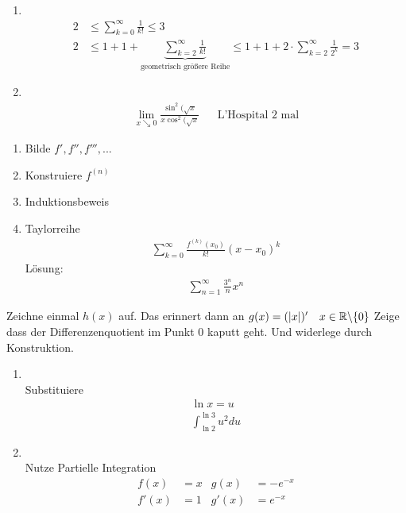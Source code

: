\begin{enumerate}[label=Aufgabe \arabic*:, , leftmargin=*]
\begin{enumerate}[label=\alph*)]
\begin{align*}
        \end{align*}
    \end{enumerate}
    \begin{enumerate}[label=\alph*)]
        \item \textbf{}\\%
        \begin{align*}
            2 &\leq \sum_{k = 0}^\infty \frac{1}{k!} \leq 3\\
            2 &\leq 1 + 1 + \underbrace{\sum_{k = 2}^\infty \frac{1}{k!}}_{\text{geometrisch größere Reihe}} \leq 1 + 1 + 2 \cdot \sum_{k = 2}^\infty \frac{1}{2^k} = 3
        \end{align*}
        \item \textbf{}\\%
        \begin{align*}
            \lim_{x \searrow 0} \frac{\sin^2(\sqrt{x}}{x \cos^2(\sqrt{x}} && \text{L'Hospital 2 mal}
        \end{align*}
    \end{enumerate}
    \begin{enumerate}[label=\underline{\arabic*}]
        \item Bilde $f', f'', f''', ...$
        \item Konstruiere $f^{(n)}$
        \item Induktionsbeweis
        \item Taylorreihe 
        \begin{align*}
            \sum_{k = 0}^\infty \frac{f^{(k)} (x_0)}{k!} (x - x_0) ^k
        \end{align*}
        Lösung:
        \begin{align*}
            \sum_{n=1}^\infty \frac{3^n}{n} x^n
        \end{align*}
    \end{enumerate}
    Zeichne einmal $h(x)$ auf. Das erinnert dann an $g(x) = (|x|)' \quad x \in \mathbb R \backslash \{0\}$
    Zeige dass der Differenzenquotient im Punkt 0 kaputt geht. Und widerlege durch Konstruktion.
    \begin{enumerate}[label=\alph*)]
        \item \textbf{}\\%
        Substituiere
        \begin{align*}
            \ln x = u\\
            \int_{\ln 2}^{\ln 3} u^2 du
        \end{align*}
        \item \textbf{}\\%
        Nutze Partielle Integration
        \begin{align*}
            f(x) &= x & g(x) &= - e^{-x}\\
            f'(x) &= 1 & g'(x) &= e ^{-x}
        \end{align*}
    \end{enumerate}
\end{enumerate}

